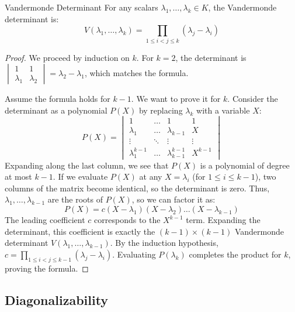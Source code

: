 \documentclass[11pt, a4paper]{article}
\begin{document}
\begin{theorem}{Vandermonde Determinant}{}
For any scalars $\lambda_1, \dots, \lambda_k \in K$, the Vandermonde determinant is:
$$ V(\lambda_1, \dots, \lambda_k) = \prod_{1 \le i < j \le k} (\lambda_j - \lambda_i) $$ 
\end{theorem}
\begin{proof}
We proceed by induction on $k$. 
For $k=2$, the determinant is $\begin{vmatrix} 1 & 1 \\ \lambda_1 & \lambda_2 \end{vmatrix} = \lambda_2 - \lambda_1$, which matches the formula. 

Assume the formula holds for $k-1$. We want to prove it for $k$. 
Consider the determinant as a polynomial $P(X)$ by replacing $\lambda_k$ with a variable $X$:
$$ P(X) = \begin{vmatrix} 
1 & \dots & 1 & 1 \\ 
\lambda_1 & \dots & \lambda_{k-1} & X \\ 
\vdots & \ddots & \vdots & \vdots \\ 
\lambda_1^{k-1} & \dots & \lambda_{k-1}^{k-1} & X^{k-1} 
\end{vmatrix} $$ 
Expanding along the last column, we see that $P(X)$ is a polynomial of degree at most $k-1$. 
If we evaluate $P(X)$ at any $X = \lambda_i$ (for $1 \le i \le k-1$), two columns of the matrix become identical, so the determinant is zero. 
Thus, $\lambda_1, \dots, \lambda_{k-1}$ are the roots of $P(X)$, so we can factor it as:
$$ P(X) = c (X - \lambda_1)(X - \lambda_2)\dots(X - \lambda_{k-1}) $$ 
The leading coefficient $c$ corresponds to the $X^{k-1}$ term. Expanding the determinant, this coefficient is exactly the $(k-1) \times (k-1)$ Vandermonde determinant $V(\lambda_1, \dots, \lambda_{k-1})$. 
By the induction hypothesis, $c = \prod_{1 \le i < j \le k-1} (\lambda_j - \lambda_i)$. 
Evaluating $P(\lambda_k)$ completes the product for $k$, proving the formula. 
\end{proof}

\subsection{Diagonalizability}
\end{document}
